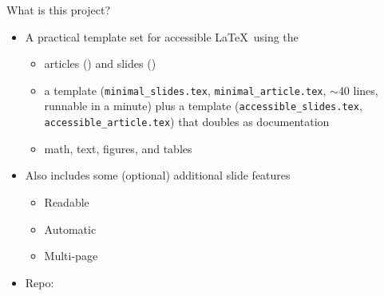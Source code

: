 \begin{frame}{What is this project?}

\begin{itemize}
\item A practical template set for accessible \LaTeX\ using the 
  \begin{itemize}
  \item {} articles () and slides ()
  \item {} a  template (\texttt{minimal\_slides.tex}, \texttt{minimal\_article.tex}, $\sim$40 lines, runnable in a minute) plus a  template (\texttt{accessible\_slides.tex}, \texttt{accessible\_article.tex}) that doubles as documentation
  \item {} math, text, figures, and tables
  \end{itemize}

  \bigskip

\item Also includes some (optional) additional slide features
  \begin{itemize}
  \item Readable  
  \item Automatic 
  \item Multi-page 
  \end{itemize}
  
\bigskip

\item Repo: 

\end{itemize}
\end{frame}

